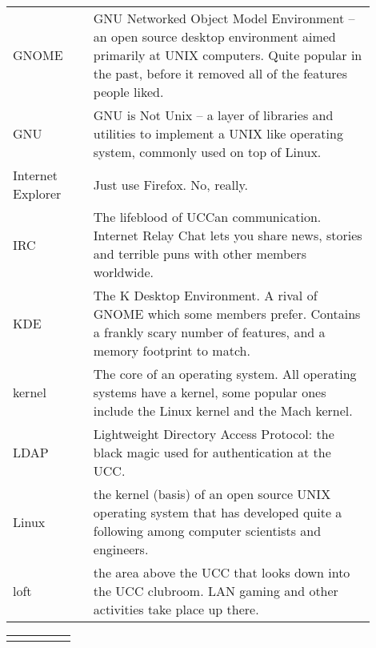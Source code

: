 {\begin{tabular}{p{0.2\linewidth}|p{0.7\linewidth}}
GNOME &
GNU Networked Object Model Environment -- an open source desktop environment aimed primarily at UNIX computers. Quite popular in the past, before it removed all of the features people liked. \\
GNU &
GNU is Not Unix -- a layer of libraries and utilities to implement a UNIX like operating system, commonly used on top of Linux. \\
Internet Explorer &
Just use Firefox. No, really. \\
IRC &
The lifeblood of UCCan communication. Internet Relay Chat lets you share news, stories and terrible puns with other members worldwide. \\
KDE &
The K Desktop Environment. A rival of GNOME which some members prefer. Contains a frankly scary number of features, and a memory footprint to match. \\
kernel &
The core of an operating system. All operating systems have a kernel, some popular ones include the Linux kernel and the Mach kernel. \\
LDAP &
Lightweight Directory Access Protocol: the black magic used for authentication at the UCC. \\
Linux &
the kernel (basis) of an open source UNIX operating system that has developed quite a following among computer scientists and engineers. \\
loft &
the area above the UCC that looks down into the UCC clubroom. LAN gaming and other activities take place up there.

\end{tabular}

\begin{tabular}{p{0.2\linewidth}|p{0.7\linewidth}}
	\rowcolor{black} \color{white}{Term} & \color{white}{Translation} \\


\end{tabular}}
